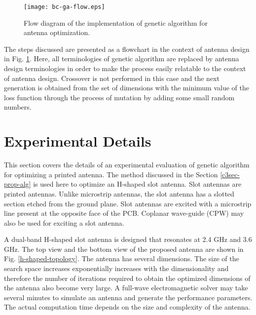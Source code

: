 \begin{figure}[h]
\centering
\texttt{[image: bc-ga-flow.eps]}
\caption{Flow diagram of the implementation of genetic algorithm for antenna optimization.}\label{ga-flow}
\end{figure}

The steps discussed are presented as a flowchart in the context of antenna design in Fig. \ref{ga-flow}. Here, all terminologies of genetic algorithm are replaced by antenna design terminologies in order to make the process easily relatable to the context of antenna design. Crossover is not performed in this case and the next generation is obtained from the set of dimensions with the minimum value of the loss function through the process of mutation by adding some small random numbers.

\section{Experimental Details} \label{c3sec-exp-details}
This section covers the details of an experimental evaluation of genetic algorithm for optimizing a printed antenna. The method discussed in the Section \ref{c3sec-prop-alg} is used here to optimize an H-shaped slot antenna. Slot antennas are printed antennas. Unlike microstrip antennas, the slot antenna has a slotted section etched from the ground plane. Slot antennas are excited with a microstrip line present at the opposite face of the PCB. Coplanar wave-guide (CPW) may also be used for exciting a slot antenna.

A dual-band H-shaped slot antenna is designed that resonates at 2.4 GHz and 3.6 GHz. The top view and the bottom view of the proposed antenna are shown in Fig. \ref{h-shaped-topology}. The antenna has several dimensions. The size of the search space increases exponentially increases with the dimensionality and therefore the number of iterations required to obtain the optimized dimensions of the antenna also become very large. A full-wave electromagnetic solver may take several minutes to simulate an antenna and generate the performance parameters. The actual computation time depends on the size and complexity of the antenna.

